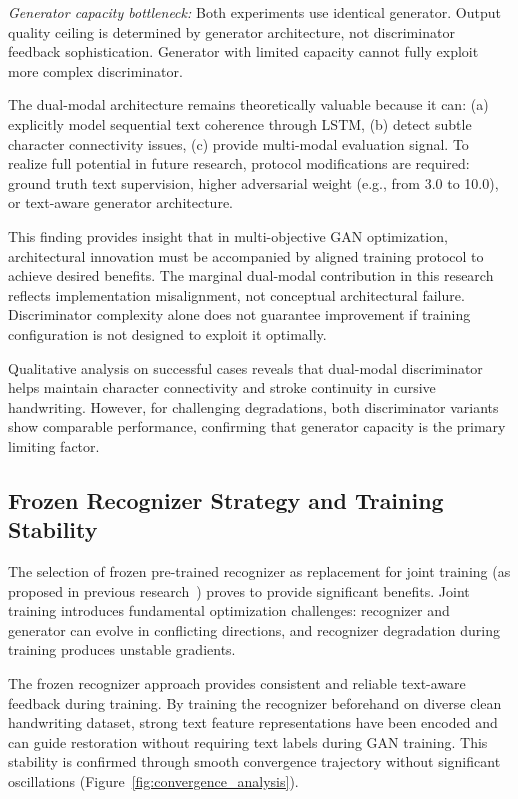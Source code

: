 \documentclass[journal]{IEEEtran}
\begin{document}
\textit{Generator capacity bottleneck:} Both experiments use identical generator. Output quality ceiling is determined by generator architecture, not discriminator feedback sophistication. Generator with limited capacity cannot fully exploit more complex discriminator.

The dual-modal architecture remains theoretically valuable because it can: (a) explicitly model sequential text coherence through LSTM, (b) detect subtle character connectivity issues, (c) provide multi-modal evaluation signal. To realize full potential in future research, protocol modifications are required: ground truth text supervision, higher adversarial weight (e.g., from 3.0 to 10.0), or text-aware generator architecture.

This finding provides insight that in multi-objective GAN optimization, architectural innovation must be accompanied by aligned training protocol to achieve desired benefits. The marginal dual-modal contribution in this research reflects implementation misalignment, not conceptual architectural failure. Discriminator complexity alone does not guarantee improvement if training configuration is not designed to exploit it optimally.

Qualitative analysis on successful cases reveals that dual-modal discriminator helps maintain character connectivity and stroke continuity in cursive handwriting. However, for challenging degradations, both discriminator variants show comparable performance, confirming that generator capacity is the primary limiting factor.

\subsection{Frozen Recognizer Strategy and Training Stability}

The selection of frozen pre-trained recognizer as replacement for joint training (as proposed in previous research~\cite{souibgui2021enhance}) proves to provide significant benefits. Joint training introduces fundamental optimization challenges: recognizer and generator can evolve in conflicting directions, and recognizer degradation during training produces unstable gradients.

The frozen recognizer approach provides consistent and reliable text-aware feedback during training. By training the recognizer beforehand on diverse clean handwriting dataset, strong text feature representations have been encoded and can guide restoration without requiring text labels during GAN training. This stability is confirmed through smooth convergence trajectory without significant oscillations (Figure~\ref{fig:convergence_analysis}).
\end{document}
